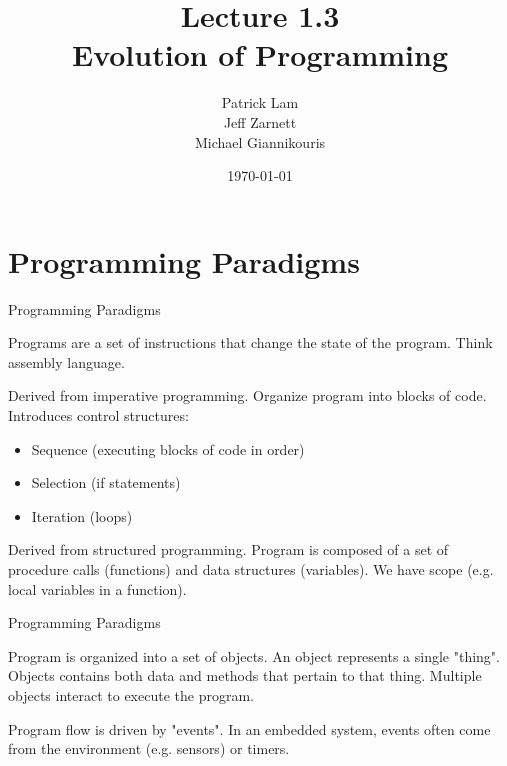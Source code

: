 \documentclass[aspectratio=169]{beamer}
\title{Lecture 1.3 \\ Evolution of Programming}
\date{\today}
\author{Patrick Lam \\ Jeff Zarnett \\ Michael Giannikouris}
\institute{Department of Electrical and Computer Engineering}
\begin{document}
\maketitle

\section{Programming Paradigms}
  
\begin{frame}{Programming Paradigms}
	\begin{description}
	\setlength\itemsep{1em}
		\item[Imperative]		
		Programs are a set of instructions that change the state of the program. Think assembly language.
		
		\item[Structured]
		Derived from imperative programming. Organize program into blocks of code. Introduces control structures:
		
		\begin{itemize}
			\item Sequence	(executing blocks of code in order)
			\item Selection (if statements)
			\item Iteration (loops)
		\end{itemize}
		
		\item[Procedural]
		Derived from structured programming. Program is composed of a set of procedure calls (functions) and data structures (variables). We have scope (e.g. local variables in a function).

	\end{description}
\end{frame}  
  
\begin{frame}{Programming Paradigms}

	\begin{description}
	\setlength\itemsep{1em}
		\item[Object-Oriented (OOP)]
		Program is organized into a set of objects. An object represents a single "thing". Objects contains both data and methods that pertain to that thing. Multiple objects interact to execute the program.
		
		\item[Event-Driven]
		Program flow is driven by "events". In an embedded system, events often come from the environment (e.g. sensors) or timers.
	\end{description}
\end{frame}  
\end{document}
